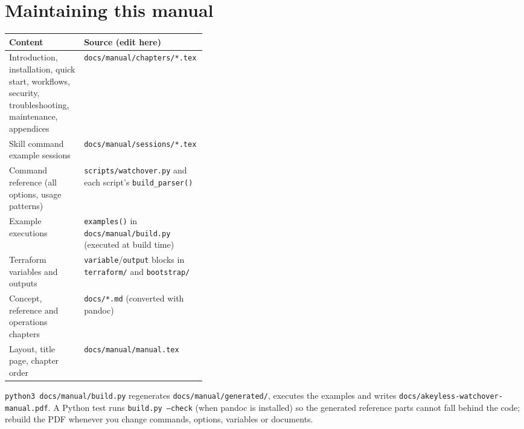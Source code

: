\section{Maintaining this manual}\label{sec:manual-maintenance}
\begin{center}\small
\begin{tabularx}{\linewidth}{@{}>{\raggedright\arraybackslash}p{0.38\linewidth}>{\raggedright\arraybackslash}X@{}}
\toprule
\textbf{Content} & \textbf{Source (edit here)} \\ \midrule
Introduction, installation, quick start, workflows, security, troubleshooting, maintenance, appendices & \texttt{docs/manual/chapters/*.tex} \\
Skill command example sessions & \texttt{docs/manual/sessions/*.tex} \\
Command reference (all options, usage patterns) & \texttt{scripts/watchover.py} and each script's \texttt{build\_parser()} \\
Example executions & \texttt{examples()} in \texttt{docs/manual/build.py} (executed at build time) \\
Terraform variables and outputs & \texttt{variable}/\texttt{output} blocks in \texttt{terraform/} and \texttt{bootstrap/} \\
Concept, reference and operations chapters & \texttt{docs/*.md} (converted with pandoc) \\
Layout, title page, chapter order & \texttt{docs/manual/manual.tex} \\
\bottomrule
\end{tabularx}
\end{center}
\texttt{python3 docs/manual/build.py} regenerates \texttt{docs/manual/generated/}, executes the
examples and writes \texttt{docs/akeyless-watchover-manual.pdf}. A Python test runs
\texttt{build.py --check} (when pandoc is installed) so the generated reference parts cannot fall
behind the code; rebuild the PDF whenever you change commands, options, variables or documents.
